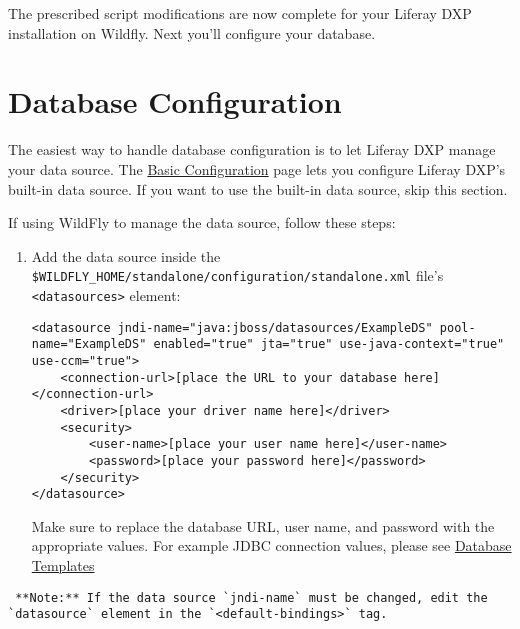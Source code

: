 The prescribed script modifications are now complete for your Liferay
DXP installation on Wildfly. Next you'll configure your database.

\section{Database Configuration}\label{database-configuration-1}

The easiest way to handle database configuration is to let Liferay DXP
manage your data source. The
\href{/docs/7-2/deploy/-/knowledge_base/d/preparing-for-install\#using-the-built-in-data-source}{Basic
Configuration} page lets you configure Liferay DXP's built-in data
source. If you want to use the built-in data source, skip this section.

If using WildFly to manage the data source, follow these steps:

\begin{enumerate}
\def\labelenumi{\arabic{enumi}.}
\item
  Add the data source inside the
  \texttt{\$WILDFLY\_HOME/standalone/configuration/standalone.xml}
  file's \texttt{\textless{}datasources\textgreater{}} element:

\begin{verbatim}
<datasource jndi-name="java:jboss/datasources/ExampleDS" pool-name="ExampleDS" enabled="true" jta="true" use-java-context="true" use-ccm="true">
    <connection-url>[place the URL to your database here]</connection-url>
    <driver>[place your driver name here]</driver>
    <security>
        <user-name>[place your user name here]</user-name>
        <password>[place your password here]</password>
    </security>
</datasource>
\end{verbatim}

  Make sure to replace the database URL, user name, and password with
  the appropriate values. For example JDBC connection values, please see
  \href{/docs/7-2/deploy/-/knowledge_base/d/database-templates}{Database
  Templates}
\end{enumerate}

\noindent\hrulefill

\begin{verbatim}
 **Note:** If the data source `jndi-name` must be changed, edit the `datasource` element in the `<default-bindings>` tag.
\end{verbatim}

\noindent\hrulefill


